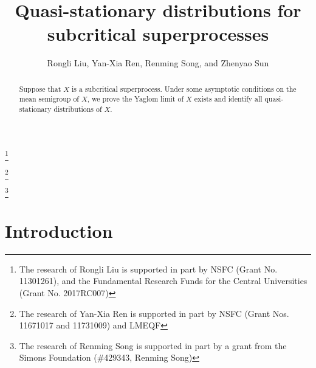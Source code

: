 \documentclass[12pt,a4paper]{amsart}
\numberwithin{equation}{section}
\theoremstyle{plain}
\theoremstyle{definition}
\theoremstyle{remark}
\begin{document}
\title{Quasi-stationary distributions for subcritical superprocesses}
\author[R. Liu, Y.-X. Ren, R. Song, and Z. Sun]{Rongli Liu, Yan-Xia Ren, Renming Song, and Zhenyao Sun}
\address{Rongli Liu\\ Mathematics and Applied Mathematics\\ Beijing jiaotong University\\ Beijing 100044\\ P. R. China}
\thanks{The research of Rongli Liu is supported in part by NSFC (Grant No. 11301261), and the Fundamental Research Funds for the Central Universities (Grant No.  2017RC007)}
\address{Yan-Xia Ren\\ LMAM School of Mathematical Sciences \& Center for
Statistical Science\\ Peking University\\ Beijing 100871\\ P. R. China}
\thanks{The research of Yan-Xia Ren is supported in part by NSFC (Grant Nos. 11671017 and 11731009)  and LMEQF}
\address{Renming Song\\ Department of Mathematics\\ University of Illinois at Urbana-Champaign \\ Urbana \\ IL 61801\\ USA}
\thanks{The research of Renming Song is supported in part by a grant from the Simons Foundation (\#429343, Renming Song)}
\address{Zhenyao Sun\\ Faculty of Industrial Engineering and Management \\ Technion, Isreal Institute of Technology \\ Haifa 3200003\\ Isreal}
\begin{abstract}
    Suppose that $X$ is a subcritical superprocess.
	Under some asymptotic conditions on the mean semigroup of $X$,
we prove the Yaglom limit of $X$ exists and identify all  quasi-stationary distributions of $X$.
\end{abstract}
\maketitle
\section{Introduction}
\end{document}
